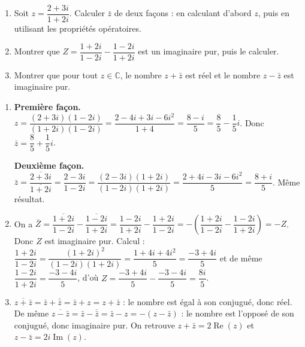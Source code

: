 \documentclass[11pt]{article}
\begin{document}
\begin{exercice}
\begin{enumerate}
\item Soit $z = \dfrac{2+3i}{1+2i}$. Calculer $\bar{z}$ de deux façons : en calculant d'abord $z$, puis en utilisant les propriétés opératoires.
\item Montrer que $Z = \dfrac{1+2i}{1-2i} - \dfrac{1-2i}{1+2i}$ est un imaginaire pur, puis le calculer.
\item Montrer que pour tout $z \in \mathbb{C}$, le nombre $z + \bar{z}$ est réel et le nombre $z - \bar{z}$ est imaginaire pur.
\end{enumerate}
\end{exercice}

\begin{corrige}[Exercice]
\begin{enumerate}
\item \textbf{Première façon.} $z = \dfrac{(2+3i)(1-2i)}{(1+2i)(1-2i)} = \dfrac{2 - 4i + 3i - 6i^2}{1+4} = \dfrac{8 - i}{5} = \dfrac{8}{5} - \dfrac{1}{5}i$. Donc $\bar{z} = \dfrac{8}{5} + \dfrac{1}{5}i$.

\textbf{Deuxième façon.} $\bar{z} = \dfrac{\overline{2+3i}}{\overline{1+2i}} = \dfrac{2-3i}{1-2i} = \dfrac{(2-3i)(1+2i)}{(1-2i)(1+2i)} = \dfrac{2+4i-3i-6i^2}{5} = \dfrac{8+i}{5}$. Même résultat.
\item On a $\bar{Z} = \overline{\dfrac{1+2i}{1-2i}} - \overline{\dfrac{1-2i}{1+2i}} = \dfrac{1-2i}{1+2i} - \dfrac{1+2i}{1-2i} = -\left(\dfrac{1+2i}{1-2i} - \dfrac{1-2i}{1+2i}\right) = -Z$. Donc $Z$ est imaginaire pur. Calcul : $\dfrac{1+2i}{1-2i} = \dfrac{(1+2i)^2}{(1-2i)(1+2i)} = \dfrac{1+4i+4i^2}{5} = \dfrac{-3+4i}{5}$ et de même $\dfrac{1-2i}{1+2i} = \dfrac{-3-4i}{5}$, d'où $Z = \dfrac{-3+4i}{5} - \dfrac{-3-4i}{5} = \dfrac{8i}{5}$.
\item $\overline{z+\bar{z}} = \bar{z} + \overline{\bar{z}} = \bar{z} + z = z + \bar{z}$ : le nombre est égal à son conjugué, donc réel. De même $\overline{z - \bar{z}} = \bar{z} - \overline{\bar{z}} = \bar{z} - z = -(z - \bar{z})$ : le nombre est l'opposé de son conjugué, donc imaginaire pur. On retrouve $z + \bar{z} = 2\operatorname{Re}(z)$ et $z - \bar{z} = 2i\operatorname{Im}(z)$.
\end{enumerate}
\end{corrige}
\end{document}

